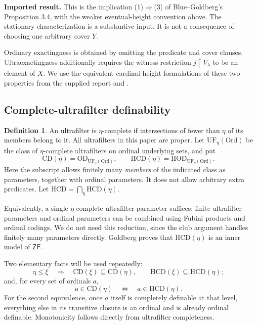 \documentclass[11pt,letterpaper]{article}
\theoremstyle{definition}
\newtheorem{definition}{Definition}[section]
\newcommand{\ZF}{\mathsf{ZF}}
\newcommand{\HOD}{\mathrm{HOD}}
\newcommand{\OD}{\mathrm{OD}}
\newcommand{\Ord}{\mathrm{Ord}}
\newcommand{\restr}{\mathbin{\upharpoonright}}
\newcommand{\CD}{\mathrm{CD}}
\newcommand{\HCD}{\mathrm{HCD}}
\newcommand{\UF}{\mathrm{UF}}
\newcommand{\Known}[1]{\textbf{Imported result.} #1}
\begin{document}
\Known{This is the implication (1)$\Rightarrow$(3) of Blue--Goldberg's
Proposition 3.4, with the weaker eventual-height convention above.
\cite[Proposition 3.4]{cover} The stationary characterization is a substantive
input. It is not a consequence of choosing one arbitrary cover $Y$.}

Ordinary exactingness is obtained by omitting the predicate and cover clauses.
Ultraexactingness additionally requires the witness restriction
$j\restr V_\lambda$ to be an element of $X$. We use the equivalent cardinal-height
formulations of these two properties from the supplied report and
\cite{abl,abgl}.

\subsection{Complete-ultrafilter definability}

\begin{definition}\label{def:hcd}
An ultrafilter is $\eta$-complete if intersections of fewer than $\eta$ of its
members belong to it. All ultrafilters in this paper are proper.
Let $\UF_\eta(\Ord)$ be the class of $\eta$-complete ultrafilters on ordinal
underlying sets, and put
\[
 \CD(\eta)=\OD_{\UF_\eta(\Ord)},\qquad
 \HCD(\eta)=\HOD_{\UF_\eta(\Ord)}.
\]
Here the subscript allows finitely many \emph{members} of the indicated class
as parameters, together with ordinal parameters. It does not allow arbitrary
extra predicates. Let $\HCD=\bigcap_\eta\HCD(\eta)$.
\end{definition}

Equivalently, a single $\eta$-complete ultrafilter parameter suffices: finite
ultrafilter parameters and ordinal parameters can be combined using Fubini
products and ordinal codings. We do not need this reduction, since the club
argument handles finitely many parameters directly. Goldberg proves that
$\HCD(\eta)$ is an inner model of $\ZF$. \cite[Propositions 4.2--4.3]{unique}

Two elementary facts will be used repeatedly:
\begin{equation}\label{eq:monotone}
 \eta\leq\xi\quad\Longrightarrow\quad
 \CD(\xi)\subseteq\CD(\eta),\qquad
 \HCD(\xi)\subseteq\HCD(\eta);
\end{equation}
and, for every set of ordinals $a$,
\begin{equation}\label{eq:ordhereditary}
 a\in\CD(\eta)\quad\Longleftrightarrow\quad a\in\HCD(\eta).
\end{equation}
For the second equivalence, once $a$ itself is completely definable at that
level, everything else in its transitive closure is an ordinal and is already
ordinal definable. Monotonicity follows directly from ultrafilter completeness.
\end{document}
